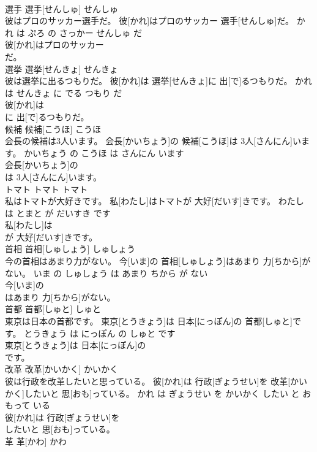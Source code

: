\documentclass[8pt]{extreport}
\begin{document}
\begin{CJK}{UTF8}{min}
\\	選手	選手[せんしゅ]	せんしゅ	
\\	彼はプロのサッカー選手だ。	彼[かれ]はプロのサッカー 選手[せんしゅ]だ。	かれ は ぷろ の さっかー せんしゅ だ	
\\	彼[かれ]はプロのサッカー
\\	だ。		
\\	選挙	選挙[せんきょ]	せんきょ	
\\	彼は選挙に出るつもりだ。	彼[かれ]は 選挙[せんきょ]に 出[で]るつもりだ。	かれ は せんきょ に でる つもり だ	
\\	彼[かれ]は
\\	に 出[で]るつもりだ。		
\\	候補	候補[こうほ]	こうほ	
\\	会長の候補は3人います。	会長[かいちょう]の 候補[こうほ]は 3人[さんにん]います。	かいちょう の こうほ は さんにん います	
\\	会長[かいちょう]の
\\	は 3人[さんにん]います。		
\\	トマト	トマト	トマト	
\\	私はトマトが大好きです。	私[わたし]はトマトが 大好[だいす]きです。	わたし は とまと が だいすき です	
\\	私[わたし]は
\\	が 大好[だいす]きです。		
\\	首相	首相[しゅしょう]	しゅしょう	
\\	今の首相はあまり力がない。	今[いま]の 首相[しゅしょう]はあまり 力[ちから]がない。	いま の しゅしょう は あまり ちから が ない	
\\	今[いま]の
\\	はあまり 力[ちから]がない。		
\\	首都	首都[しゅと]	しゅと	
\\	東京は日本の首都です。	東京[とうきょう]は 日本[にっぽん]の 首都[しゅと]です。	とうきょう は にっぽん の しゅと です	
\\	東京[とうきょう]は 日本[にっぽん]の
\\	です。		
\\	改革	改革[かいかく]	かいかく	
\\	彼は行政を改革したいと思っている。	彼[かれ]は 行政[ぎょうせい]を 改革[かいかく]したいと 思[おも]っている。	かれ は ぎょうせい を かいかく したい と おもって いる	
\\	彼[かれ]は 行政[ぎょうせい]を
\\	したいと 思[おも]っている。		
\\	革	革[かわ]	かわ	

\end{CJK}
\end{document}
